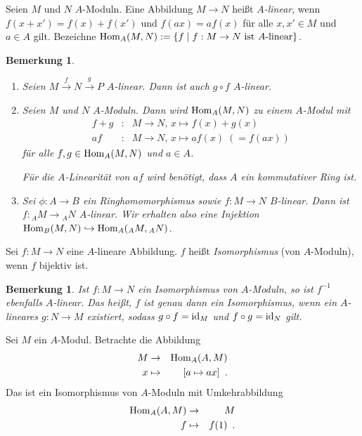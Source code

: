 \documentclass[12pt,a4paper]{scrartcl}
\theoremstyle{cplain}
\theoremstyle{cdef}
\newtheorem{beme}[thmcounter]{Bemerkung}
\begin{document}
\begin{defi}
Seien $M$ und $N$ $A$-Moduln. Eine Abbildung $M\rightarrow N$ heißt \emph{$A$-linear}, wenn $f(x+x')=f(x)+f(x')$ und $f(ax)=af(x)$ für alle $x,x'\in M$ und $a\in A$ gilt.
Bezeichne $\operatorname{Hom}_A(M, N) := \{f \mid  \text{$f: M\rightarrow N$ ist $A$-linear}\}$.
\end{defi}


\begin{beme}
	\leavevmode
	\begin{enumerate}
		\item Seien $M\xrightarrow{f}N\xrightarrow{g}P$ $A$-linear. Dann ist auch $g\circ f$ $A$-linear.
		\item Seien $M$ und $N$ $A$-Moduln. Dann wird $\operatorname{Hom}_A(M,N)$ zu einem $A$-Modul mit
		\begin{eqnarray*}
			f+g & \colon & M\to N,\, x\mapsto f(x) + g(x)\\
			af & \colon & M\to N,\, x\mapsto af(x)\; (= f(ax))
		\end{eqnarray*}
		für alle $f,g\in\operatorname{Hom}_A(M,N)$ und $a\in A$.
		
		Für die $A$-Linearität von $af$ wird benötigt, dass $A$ ein kommutativer Ring ist.
		\item Sei $\phi\colon A\to B$ ein Ringhomomorphismus sowie $f\colon M\to N$ $B$-linear. Dann ist $f\colon {}_AM\to {}_AN$ $A$-linear. Wir erhalten also eine Injektion $\operatorname{Hom}_B(M,N)\hookrightarrow \operatorname{Hom}_A({}_AM,{}_AN)$.
	\end{enumerate}
\end{beme}
\begin{defi}
	Sei $f\colon M\to N$ eine $A$-lineare Abbildung. $f$ heißt \emph{Isomorphismus} (von $A$-Moduln), wenn $f$ bijektiv ist.
\end{defi}
\begin{beme} Ist $f\colon M\to N$ ein Isomorphismus von $A$-Moduln, so ist $f^{-1}$ ebenfalls $A$-linear. Das heißt, $f$ ist genau dann ein Isomorphismus, wenn ein $A$-lineares $g\colon N\to M$ existiert, sodass $g\circ f = \operatorname{id}_M$ und $f\circ g = \operatorname{id}_N$ gilt.
\end{beme}
\begin{bsp}
	Sei $M$ ein $A$-Modul. Betrachte die Abbildung \begin{eqnarray*}
		M &\to& \operatorname{Hom}_A(A,M)\\
		x&\mapsto & [a\mapsto ax]\enspace .
	\end{eqnarray*}
	Das ist ein Isomorphismus von $A$-Moduln mit Umkehrabbildung
	\begin{eqnarray*}
		\operatorname{Hom}_A(A,M)&\to& M\\
		f &\mapsto& f(1) \enspace .
	\end{eqnarray*}
\end{bsp}
\end{document}
